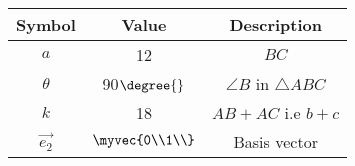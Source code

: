\begin{tabular}{|c|c|c|}
  \hline
  \textbf{Symbol}&\textbf{Value}&\textbf{Description}\\
  \hline
  $a$ & 12 & $BC$\\
  \hline
  $\theta$ & 90$\degree{}$ & $\angle{B}$ in $\triangle ABC$ \\
  \hline
  $k$ & 18 & $AB+AC$ i.e $b+c$ \\
  \hline 
  $\vec{e_2}$ & $\myvec{0\\1\\}$ & Basis vector\\
  \hline   
\end{tabular}\\
